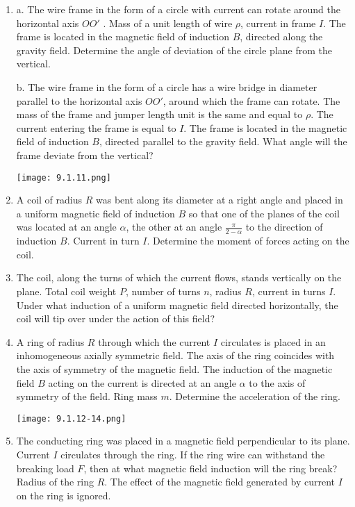 \documentclass{article}
\begin{document}
\begin{enumerate}[label=9.1.\arabic*]
\item a. The wire frame in the form of a circle with current can rotate around the horizontal axis $OO'$ . Mass of a unit length of wire $\rho$, current in frame $I$. The frame is located in the magnetic field of induction $B$, directed along the gravity field. Determine the angle of deviation of the circle plane from the vertical. 

b. The wire frame in the form of a circle has a wire bridge in diameter parallel to the horizontal axis $OO'$, around which the frame can rotate. The mass of the frame and jumper length unit is the same and equal to $\rho$. The current entering the frame is equal to $I$. The frame is located in the magnetic field of induction $B$, directed parallel to the gravity field. What angle will the frame deviate from the vertical?

\begin{center}
    \texttt{[image: 9.1.11.png]}
\end{center}

\item A coil of radius $R$ was bent along its diameter at a right angle and placed in a uniform magnetic field of induction $B$ so that one of the planes of the coil was located at an angle $\alpha$, the other at an angle $\frac{\pi}{2-\alpha}$ to the direction of induction $B$. Current in turn $I$. Determine the moment of forces acting on the coil.

\item The coil, along the turns of which the current flows, stands vertically on the plane. Total coil weight $P$, number of turns $n$, radius $R$, current in turns $I$. Under what induction of a uniform magnetic field directed horizontally, the coil will tip over under the action of this field?

\item A ring of radius $R$ through which the current $I$ circulates is placed in an inhomogeneous axially symmetric field. The axis of the ring coincides with the axis of symmetry of the magnetic field. The induction of the magnetic field $B$ acting on the current is directed at an angle $\alpha$ to the axis of symmetry of the field. Ring mass $m$. Determine the acceleration of the ring.

\begin{center}
    \texttt{[image: 9.1.12-14.png]}
\end{center}


\item The conducting ring was placed in a magnetic field perpendicular to its plane. Current $I$ circulates through the ring. If the ring wire can withstand the breaking load $F$, then at what magnetic field induction will the ring break? Radius of the ring $R$. The effect of the magnetic field generated by current $I$ on the ring is ignored.



\end{enumerate}
\end{document}
